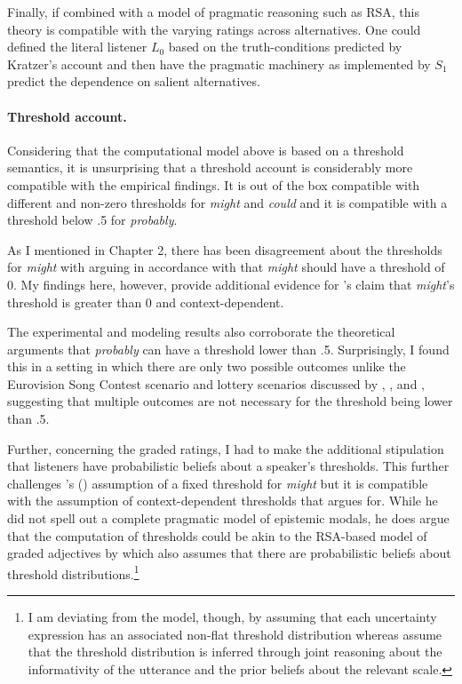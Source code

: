 Finally, if combined with a model of pragmatic reasoning such as RSA, this theory is compatible with the varying ratings across alternatives. One could defined
the literal listener $L_0$ based on the truth-conditions predicted by Kratzer's account and then have the pragmatic machinery as implemented by $S_1$ 
predict the dependence on salient alternatives. 

\paragraph{Threshold account.} Considering that the computational model above is based on a threshold semantics, 
it is unsurprising that a threshold account is considerably more compatible with the empirical findings. It is out of the box compatible
with different and non-zero thresholds for \textit{might} and \textit{could} and it is compatible with a threshold below .5 for \textit{probably}.

As I mentioned in Chapter 2, there has been disagreement about the thresholds for \textit{might} with \textcite{Yalcin2010} arguing in accordance with
\textcite{Kratzer1991} that \textit{might} should have a threshold of 0. My findings here, however, provide additional evidence for \citeauthor{Lassiter2016}'s
claim that \textit{might}'s threshold is greater than 0 and context-dependent.

The experimental and modeling results also corroborate the theoretical arguments that \textit{probably} can have a threshold lower than .5. Surprisingly,
I found this in a setting in which there are only two possible outcomes unlike the Eurovision Song Contest scenario and lottery scenarios discussed by \textcite{Lassiter2016}, \textcite{Yalcin2010}, and \textcite{Teigen1988},
suggesting that multiple outcomes are not necessary for the threshold being lower than .5.

Further, concerning the graded ratings, I had to make the additional stipulation that listeners have probabilistic beliefs about a speaker's thresholds. 
This further challenges \citeauthor{Yalcin2010}'s (\citeyear{Yalcin2010}) assumption of a fixed threshold for \textit{might} but it is compatible with the assumption of context-dependent
thresholds that \textcite{Lassiter2016} argues for. While he did not spell out a complete pragmatic model of epistemic modals, he does argue that the computation 
of thresholds could be akin to the RSA-based model of graded adjectives by \textcite{Lassiter2017b} which also assumes that there are probabilistic beliefs about
threshold distributions.\footnote{I am deviating from the \textcite{Lassiter2017b} model, though, by assuming that each uncertainty expression  has an 
associated non-flat threshold distribution whereas \textcite{Lassiter2017b} assume that the threshold distribution is inferred through joint reasoning about the informativity of the utterance and the prior beliefs about the relevant scale.}

